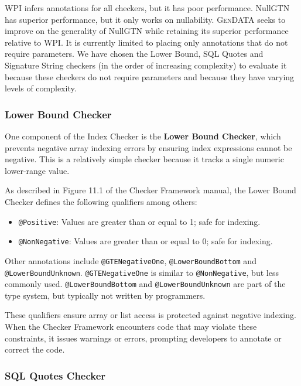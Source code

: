 \documentclass[acmsmall,screen,review,anonymous]{acmart}
\makeatletter
\newcommand{\gendata}{\textsc{GenDATA}\xspace}
\newcommand{\cf}{Checker Framework\xspace}
\newcommand{\atmark}[1]{\texttt{@#1}}
\makeatother
\begin{document}
WPI infers annotations for all checkers, but it has poor performance. NullGTN has superior performance, but it only works on nullability. \gendata seeks to improve on the generality of NullGTN while retaining its superior performance relative to WPI. It is currently limited to placing only annotations that do not require parameters. We have chosen the Lower Bound, SQL Quotes and Signature String checkers (in the order of increasing complexity) to evaluate it because these checkers do not require parameters and because they have varying levels of complexity.

\subsubsection{Lower Bound Checker}
\label{sec:lowerbound}

One component of the Index Checker is the \textbf{Lower Bound Checker}, which prevents negative array indexing errors by ensuring index expressions cannot be negative. This is a relatively simple checker because it tracks a single numeric lower-range value.

As described in Figure 11.1 of the \cf manual, the Lower Bound Checker defines the following qualifiers among others:

\begin{itemize}
    \item \atmark{Positive}: Values are greater than or equal to 1; safe for indexing.
    \item \atmark{NonNegative}: Values are greater than or equal to 0; safe for indexing.
\end{itemize}

Other annotations include \atmark{GTENegativeOne}, \atmark{LowerBoundBottom} and \atmark{LowerBoundUnknown}. \atmark{GTENegativeOne} is similar to \atmark{NonNegative}, but less commonly used. \atmark{LowerBoundBottom} and \atmark{LowerBoundUnknown} are part of the type system, but typically not written by programmers.

These qualifiers ensure array or list access is protected against negative indexing. When the \cf encounters code that may violate these constraints, it issues warnings or errors, prompting developers to annotate or correct the code.

\subsubsection{SQL Quotes Checker}
\label{sec:sqlquotes}
\end{document}
